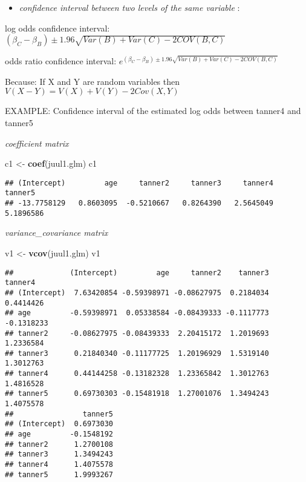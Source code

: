 \documentclass[
]{article}
\newenvironment{Shaded}{\begin{snugshade}}{\end{snugshade}}
\newcommand{\KeywordTok}[1]{\textcolor[rgb]{0.13,0.29,0.53}{\textbf{#1}}}
\newcommand{\NormalTok}[1]{#1}
\newcommand{\StringTok}[1]{\textcolor[rgb]{0.31,0.60,0.02}{#1}}
\providecommand{\tightlist}{%
  \setlength{\itemsep}{0pt}\setlength{\parskip}{0pt}}
\begin{document}
\begin{itemize}
\tightlist
\item
  \emph{confidence interval between two levels of the same variable} :
\end{itemize}

log odds confidence interval:
\((\beta_C - \beta_B) \pm 1.96 \sqrt{Var(B) + Var(C) - 2COV(B,C)}\)

odds ratio confidence interval:
\(e^{(\beta_C - \beta_B) \pm 1.96 \sqrt{Var(B) + Var(C) - 2COV(B,C)}}\)

Because: If X and Y are random variables then
\(V(X-Y) = V(X) + V(Y)- 2Cov(X,Y)\)

EXAMPLE: Confidence interval of the estimated log odds between tanner4
and tanner5

\emph{coefficient matrix}

\begin{Shaded}
\begin{Highlighting}[]
\NormalTok{c1 <-}\StringTok{ }\KeywordTok{coef}\NormalTok{(juul1.glm)}
\NormalTok{c1}
\end{Highlighting}
\end{Shaded}

\begin{verbatim}
## (Intercept)         age     tanner2     tanner3     tanner4     tanner5 
## -13.7758129   0.8603095  -0.5210667   0.8264390   2.5645049   5.1896586
\end{verbatim}

\emph{variance\_covariance matrix}

\begin{Shaded}
\begin{Highlighting}[]
\NormalTok{v1 <-}\StringTok{ }\KeywordTok{vcov}\NormalTok{(juul1.glm)}
\NormalTok{v1}
\end{Highlighting}
\end{Shaded}

\begin{verbatim}
##             (Intercept)         age     tanner2    tanner3    tanner4
## (Intercept)  7.63420854 -0.59398971 -0.08627975  0.2184034  0.4414426
## age         -0.59398971  0.05338584 -0.08439333 -0.1117773 -0.1318233
## tanner2     -0.08627975 -0.08439333  2.20415172  1.2019693  1.2336584
## tanner3      0.21840340 -0.11177725  1.20196929  1.5319140  1.3012763
## tanner4      0.44144258 -0.13182328  1.23365842  1.3012763  1.4816528
## tanner5      0.69730303 -0.15481918  1.27001076  1.3494243  1.4075578
##                tanner5
## (Intercept)  0.6973030
## age         -0.1548192
## tanner2      1.2700108
## tanner3      1.3494243
## tanner4      1.4075578
## tanner5      1.9993267
\end{verbatim}
\end{document}
